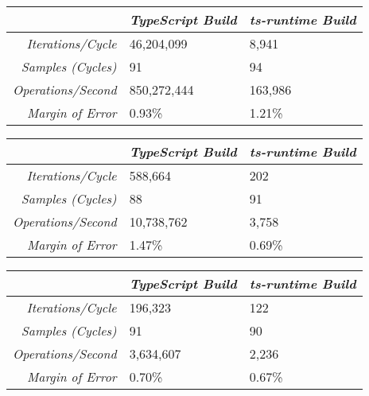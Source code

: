 \begin{center}
{
\centering
\tabulinesep=1.2mm
\setlength{\tabcolsep}{5mm}
\def\arraystretch{1.25}
\small
\begin{tabu} to \textwidth {|r||X[c,m]|X[c,m]|}
  \hline
  & \emph{TypeScript Build} & \emph{ts-runtime Build} \\
  \hline
  \hline
  \emph{Iterations/Cycle}  & 46,204,099 & 8,941 \\
  \hline
  \emph{Samples (Cycles)}  & 91 & 94 \\
  \hline
  \emph{Operations/Second} & 850,272,444 & 163,986 \\
  \hline
  \emph{Margin of Error}   & 0.93\% & 1.21\% \\
  \hline
\end{tabu}
}
\end{center}

\begin{center}
{
\centering
\tabulinesep=1.2mm
\setlength{\tabcolsep}{5mm}
\def\arraystretch{1.25}
\small
\begin{tabu} to \textwidth {|r||X[c,m]|X[c,m]|}
  \hline
  & \emph{TypeScript Build} & \emph{ts-runtime Build} \\
  \hline
  \hline
  \emph{Iterations/Cycle}  & 588,664 & 202 \\
  \hline
  \emph{Samples (Cycles)}  & 88 & 91 \\
  \hline
  \emph{Operations/Second} & 10,738,762 & 3,758 \\
  \hline
  \emph{Margin of Error}   & 1.47\% & 0.69\% \\
  \hline
\end{tabu}
}
\end{center}

\begin{center}
{
\centering
\tabulinesep=1.2mm
\setlength{\tabcolsep}{5mm}
\def\arraystretch{1.25}
\small
\begin{tabu} to \textwidth {|r||X[c,m]|X[c,m]|}
  \hline
  & \emph{TypeScript Build} & \emph{ts-runtime Build} \\
  \hline
  \hline
  \emph{Iterations/Cycle}  & 196,323 & 122 \\
  \hline
  \emph{Samples (Cycles)}  & 91 & 90 \\
  \hline
  \emph{Operations/Second} & 3,634,607 & 2,236 \\
  \hline
  \emph{Margin of Error}   & 0.70\% & 0.67\% \\
  \hline
\end{tabu}
}
\end{center}

